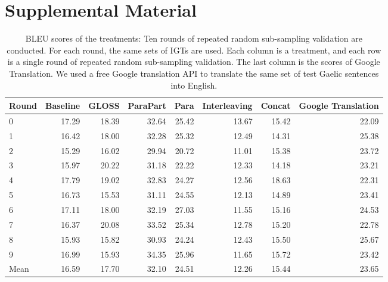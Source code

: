 \documentclass[11pt,a4paper]{article}
\begin{document}
\section{Supplemental Material}
\begin{table}[ht]
\centering
\begin{tabular}{lrrrrrrr}
  \hline
Round & Baseline & GLOSS & ParaPart & Para & Interleaving & Concat & Google Translation \\ 
  \hline
0 & 17.29 & 18.39 & 32.64 & 25.42 & 13.67 & 15.42 & 22.09 \\ 
  1 & 16.42 & 18.00 & 32.28 & 25.32 & 12.49 & 14.31 & 25.38 \\ 
  2 & 15.29 & 16.02 & 29.94 & 20.72 & 11.01 & 15.38 & 23.72 \\ 
  3 & 15.97 & 20.22 & 31.18 & 22.22 & 12.33 & 14.18 & 23.21 \\ 
  4 & 17.79 & 19.02 & 32.83 & 24.27 & 12.56 & 18.63 & 22.31 \\ 
  5 & 16.73 & 15.53 & 31.11 & 24.55 & 12.13 & 14.89 & 23.41 \\ 
  6 & 17.11 & 18.00 & 32.19 & 27.03 & 11.55 & 15.16 & 24.53 \\ 
  7 & 16.37 & 20.08 & 33.52 & 25.34 & 12.78 & 15.20 & 22.78 \\ 
  8 & 15.93 & 15.82 & 30.93 & 24.24 & 12.43 & 15.50 & 25.67 \\ 
  9 & 16.99 & 15.93 & 34.35 & 25.96 & 11.65 & 15.72 & 23.42 \\ 
   \hline
Mean & 16.59 & 17.70 & 32.10 & 24.51 & 12.26 & 15.44 & 23.65 \\ 
   \hline
\end{tabular}
\caption{BLEU scores of the treatments: Ten rounds of repeated random sub-sampling validation are conducted. For each round, the same sets of IGTs are used. Each column is a treatment, and each row is a single round of repeated random sub-sampling validation. The last column is the scores of Google Translation. We used a free Google translation API \citep{google_api} to translate the same set of test Gaelic sentences into English.} 
\label{table:complete_table}
\end{table}
\end{document}
